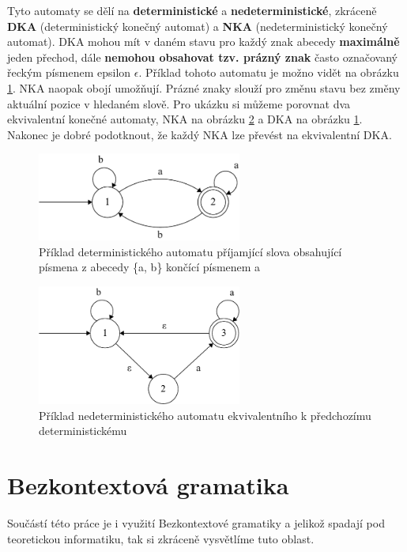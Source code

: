 Tyto automaty se dělí na \textbf{deterministické} a \textbf{nedeterministické}, zkráceně \textbf{DKA} (deterministický konečný automat) a \textbf{NKA} (nedeterministický konečný automat).
DKA mohou mít v daném stavu pro každý znak abecedy \textbf{maximálně} jeden přechod, dále \textbf{nemohou obsahovat tzv. prázný znak} často označovaný řeckým písmenem epsilon $\epsilon$.
Příklad tohoto automatu je možno vidět na obrázku \ref{fig:DFAex}.
NKA naopak obojí umožňují. 
Prázné znaky slouží pro změnu stavu bez změny aktuální pozice v hledaném slově. 
Pro ukázku si můžeme porovnat dva ekvivalentní konečné automaty,
NKA na obrázku \ref{fig:NFAex} a DKA na obrázku \ref{fig:DFAex}.
Nakonec je dobré podotknout, že každý NKA lze převést na ekvivalentní DKA.

\begin{figure}[!h]
	\centering
	\includegraphics[width=0.6\textwidth]{Figures/DFA_example.pdf}
	\caption{Příklad deterministického automatu příjamjící slova obsahující písmena z abecedy \{a, b\} končící písmenem a}
	\label{fig:DFAex}
\end{figure}

\begin{figure}[!h]
	\centering
	\includegraphics[width=0.6\textwidth]{Figures/NFA_example.pdf}
	\caption{Příklad nedeterministického automatu ekvivalentního k předchozímu deterministickému}
	\label{fig:NFAex}
\end{figure}

\section{Bezkontextová gramatika}
Součástí této práce je i využití Bezkontextové gramatiky a jelikož spadají pod teoretickou informatiku, 
tak si zkráceně vysvětlíme tuto oblast.

